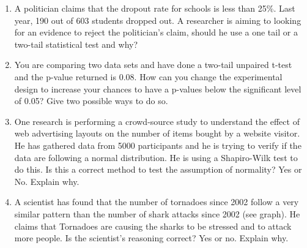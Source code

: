 \documentclass{article}
\newif\ifanswer
\begin{document}
\begin{enumerate}
\ifanswer
(Answer: 0.005/10 because there are 10 comparisons made)
\fi

\item A politician claims that the dropout rate for schools is less
  than 25\%. Last year, 190 out of 603 students dropped out. A
  researcher is aiming to looking for an evidence to reject the
  politician's claim, should he use a one tail or a two-tail
  statistical test and why?

\ifanswer
(Answer: one-tail is enough because the researcher is only interested in one direction. i.e. the dropout rate below 25\%. If the question was \lq{}equal to\rq{} we would use a two-tail test)
\fi

\item You are comparing two data sets and have done a two-tail
  unpaired t-test and the p-value returned is 0.08. How can you change
  the experimental design to increase your chances to have a p-values
  below the significant level of 0.05? Give two possible ways to do
  so.

\ifanswer  
(Answers possible: increase the sample size, used paired data (within subject experiment), design the experiment as one-tail)
\fi

\item One research is performing a crowd-source study to understand
  the effect of web advertising layouts on the number of items bought
  by a website visitor. He has gathered data from 5000 participants
  and he is trying to verify if the data are following a normal
  distribution. He is using a Shapiro-Wilk test to do this. Is this a
  correct method to test the assumption of normality? Yes or
  No. Explain why.

\ifanswer  
(Answer: False. Kolmogorov-Smirnov test is more appropriate for large sample size $N >50$ and Shapiro-Wilk for small sample size $N <=50$)
\fi

\item A scientist has found that the number of tornadoes since 2002
  follow a very similar pattern than the number of shark attacks since
  2002 (see graph). He claims that Tornadoes are causing the sharks to
  be stressed and to attack more people. Is the scientist's reasoning
  correct? Yes or no. Explain why.


  \ifanswer

  (Answer: No. The graphs show a correlation between the two data sets but not causality.  A correlation does not mean that the change in one variable is the cause of the change in the values of the other variable.
  \fi


\end{enumerate}
\end{document}
